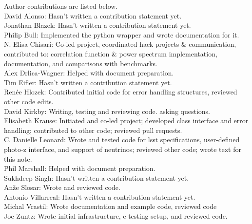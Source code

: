 Author contributions are listed below. \\
David Alonso: Hasn't written a contribution statement yet. \\
Jonathan Blazek: Hasn't written a contribution statement yet. \\
Philip Bull: Implemented the python wrapper and wrote documentation for it. \\
N. Elisa Chisari: Co-led project, coordinated hack projects \& communication, contributed to: correlation function \& power spectrum implementation, documentation, and comparisons with benchmarks. \\
Alex Drlica-Wagner: Helped with document preparation. \\
Tim Eifler: Hasn't written a contribution statement yet. \\
Ren\'ee Hlozek: Contributed initial code for error handling structures, reviewed other code edits. \\
David Kirkby: Writing, testing and reviewing code. asking questions. \\
Elisabeth Krause: Initiated and co-led project; developed class interface and error handling; contributed to other code; reviewed pull requests. \\
C. Danielle Leonard: Wrote and tested code for lsst specifications, user-defined photo-z interface, and support of neutrinos; reviewed other code; wrote text for this note. \\
Phil Marshall: Helped with document preparation. \\
Sukhdeep Singh: Hasn't written a contribution statement yet. \\
An\v{z}e Slosar: Wrote and reviewed code. \\
Antonio Villarreal: Hasn't written a contribution statement yet. \\
Michal Vrastil: Wrote documentation and example code, reviewed code \\
Joe Zuntz: Wrote initial infrastructure, c testing setup, and reviewed code. \\
